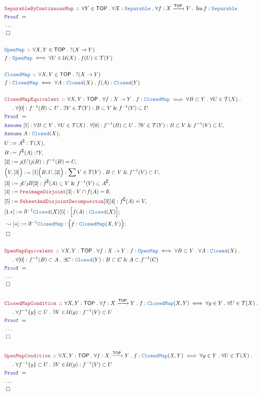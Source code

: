 \documentclass[12pt]{scrartcl}
\newcommand{\TYPE}[1]{\textcolor{NavyBlue}{\mathtt{#1}}}
\newcommand{\LOGIC}[1]{\textcolor{Blue}{\mathtt{#1}}}
\newcommand{\THM}[1]{\textcolor{Maroon}{\mathtt{#1}}}
\renewcommand{\.}{\; . \;}
\newcommand{\de}{: \kern 0.1pc =}
\newcommand{\Theorem}[2]{& \THM{#1} \, :: \, #2 \\ & \Proof = \\ }
\newcommand{\DeclareType}[2]{& \TYPE{#1} \, :: \, #2 \\}
\newcommand{\DefineType}[3]{& #1 : \TYPE{#2} \iff #3 \\}
\newcommand{\NewLine}{\\ & \kern 1pc}
\newcommand{\Page}[1]{ \begin{align*} #1 \end{align*}   }
\newcommand{ \bd }{ \ByDef }
\newcommand{\NoProof}{ & \ldots \\ \EndProof}
\renewcommand{\And}{\; \& \;}
\DeclareMathOperator*{\im}{Im}
\newcommand{\Arrow}{\xrightarrow}
\renewcommand{\c}{\complement}
\newcommand{\Say}[3]{& #1 \de #2 : #3, \\}
\newcommand{\Conclude}[3]{& #1 \de #2 : #3; \\}
\newcommand{\DeriveConclude}[3]{& \leadsto #1 \de #2 : #3 ; \\}
\newcommand{\Assume}[2]{& \LOGIC{Assume} \; #1 : #2, \\}
\newcommand{\QED}{\; \square}
\newcommand{\EndProof}{& \QED \\}
\newcommand{\ByDef}{\eth}
\newcommand{\ByConstr}{\jmath}
\newcommand{\Proof}{\LOGIC{Proof} \; }
\newcommand{\TOP}{\mathsf{TOP}}
\newcommand{\T}{\mathcal{T}}
\renewcommand{\U}{\mathcal{U}}
\begin{document}
\Page{
	\Theorem{SeparableByContinuousMap}
	{
		\forall Y \in \TOP \.
		\forall X : \TYPE{Separable} \.
		\forall f : X \Arrow{\TOP} Y \.
		\im f  : \TYPE{Separable} 
	}
	\NoProof
	\\
	\DeclareType{OpenMap}
	{
		\forall X,Y \in \TOP \.
		?(X \to Y)
	}
	\DefineType{f}{OpenMap}
	{
		\forall U \in \U(X) \.
		f(U) \in \T(Y)
	}
	\\
	\DeclareType{ClosedMap}
	{
		\forall X,Y \in \TOP \.
		?(X \to Y)
	}
	\DefineType{f}{ClosedMap}
	{
		\forall A : \TYPE{Closed}(X) \.
		f(A) : \TYPE{Closed}(Y)
	}
	\\
	\Theorem{ClosedMapEquivalent}
	{
		\forall X,Y : \TOP \.
		\forall f : X \to Y \.
		f : \TYPE{ClosedMap} \iff
		\forall B \subset Y \.
		\forall U \in \T(X) \.
		\NewLine \. 
		\forall [0] : f^{-1}(B) \subset U \.
		\exists V \in \T(Y) : B \subset V
		\And f^{-1}(V) \subset U
	}
	\Assume{[1]}{   
		\forall B \subset Y \. 
		\forall U \in \T(X) \. 
		\forall [0] :  f^{-1}(B) \subset  U\.
		\exists V \in \T(Y) :  B \subset V \And f^{-1}(V) \subset U
	}
	\Assume{A}{\TYPE{Closed}(X)}
	\Say{U}{A^\c}{\T(X)}
	\Say{B}{f^\c(A)}{?Y}
	\Say{[2]}{\ByConstr(U)\ByConstr(B)}{f^{-1}(B) = U}
	\Say{\Big( V, [3]\Big)}{[1]\Big(B,U,[2]\Big)}
	{
		\sum V \in T(Y)  \.  B \subset V \And f^{-1}(V) \subset U
	}
	\Say{[3]}{\ByConstr U \ByConstr B [2]} 
	{
		f^\c(A) \subset V   \And f^{-1}(V) \subset A^{\c}
	}
	\Say{[4]}{\THM{PreimageDisjoint}[3]}{  V \cap f(A) = \emptyset }
	\Say{[5]}{\THM{SubsetAndDisjointDecompositon}[3][4]}{f^\c(A) = V}
	\Conclude{[1.*]}{\bd^{-1}\TYPE{Closed}(X)[5]}{\Big[ f(A) : \TYPE{Closed}(X)  \Big]}
	\DeriveConclude{[*]}{\bd^{-1} \TYPE{ClosedMap}}
	{
		\Big( f : \TYPE{ClosedMap}(X,Y) \Big)		
	}
	\EndProof
	\\
	\Theorem{OpenMapEquivalent}
	{
		\forall X,Y : \TOP \.
		\forall f : X \to Y \.
		f : \TYPE{OpenMap} \iff
		\forall B \subset Y \.
		\forall A : \TYPE{Closed}(X) \.
		\NewLine \. 
		\forall [0] : f^{-1}(B) \subset A  \.
		\exists C : \TYPE{Closed}(Y) : B \subset C \And A \subset f^{-1}(C)
	}
	\NoProof
	\\
	\Theorem{ClosedMapCondition}
	{
		\forall X,Y : \TOP \.
		\forall f : X \Arrow{\TOP} Y \.
		f : \TYPE{ClosedMap}(X,Y) \iff 
		\forall y \in Y \. 
		\forall U \in \T(X) \. 
		\NewLine \.
		\forall f^{-1}\{y\} \subset U \.
		\exists V \in \U(y) :
		f^{-1}(V) \subset U
	}
	\NoProof
	\\
	\Theorem{OpenMapCondition}
	{
		\forall X,Y : \TOP \.
		\forall f : X \Arrow{\TOP} Y \.
		f : \TYPE{ClosedMap}(X,Y) \iff 
		\forall y \in Y \. 
		\forall U \in \T(X) \. 
		\NewLine \.
		\forall f^{-1}\{y\} \subset U \.
		\exists V \in \U(y) :
		f^{-1}(V) \subset U
	}
	\NoProof
}
\end{document}
